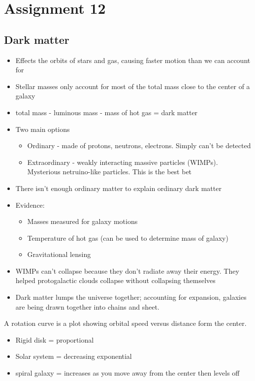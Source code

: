 \section{Assignment 12}

\subsection{Dark matter}

\begin{itemize}
    \item Effects the orbits of stars and gas, causing faster motion than we can account for
    \item Stellar masses only account for most of the total mass close to the center of a galaxy
    \item total mass - luminous mass - mass of hot gas = dark matter
    \item Two main options
    \begin{itemize}
        \item Ordinary - made of protons, neutrons, electrons.  Simply can't be detected
        \item Extraordinary - weakly interacting massive particles (WIMPs).  Mysterious netruino-like particles.  This is the best bet
    \end{itemize}
    \item There isn't enough ordinary matter to explain ordinary dark matter
    \item Evidence:
    \begin{itemize}
        \item Masses measured for galaxy motions
        \item Temperature of hot gas (can be used to determine mass of galaxy)
        \item Gravitational lensing
    \end{itemize}
    \item WIMPs can't collapse because they don't radiate away their energy.  They helped protogalactic clouds collapse without collapsing themselves
    \item Dark matter lumps the universe together; accounting for expansion, galaxies are being drawn together into chains and sheet.
\end{itemize}

A rotation curve is a plot showing orbital speed versus distance form the center.
\begin{itemize}
    \item Rigid disk = proportional
    \item Solar system = decreasing exponential
    \item spiral galaxy = increases as you move away from the center then levels off
\end{itemize}

